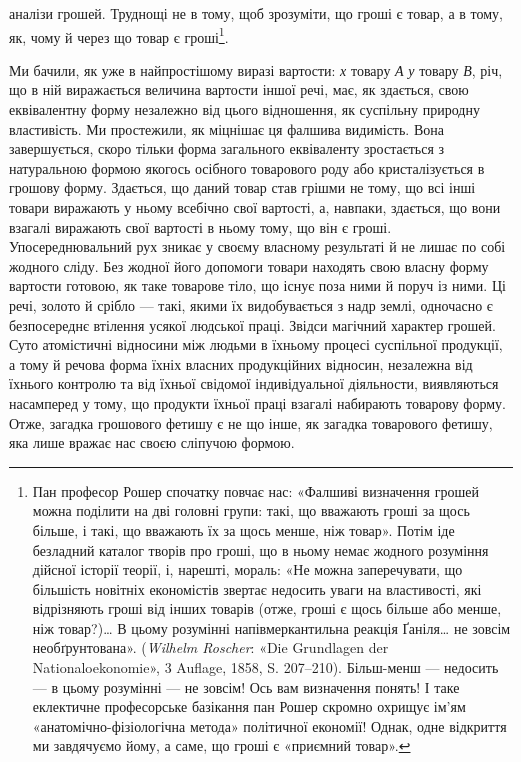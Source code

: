 \parcont{}  %
аналізи грошей. Труднощі не в тому, щоб зрозуміти, що гроші
є товар, а в тому, як, чому й через що товар є гроші\footnote{
Пан професор Рошер спочатку повчає нас: «Фалшиві визначення
грошей можна поділити на дві головні групи: такі, що вважають гроші
за щось більше, і такі, що вважають їх за щось менше, ніж товар». Потім
іде безладний каталог творів про гроші, що в ньому немає жодного
розуміння дійсної історії теорії, і, нарешті, мораль: «Не можна заперечувати,
що більшість новітніх економістів звертає недосить уваги
на властивості, які відрізняють гроші від інших товарів (отже, гроші є
щось більше або менше, ніж товар?)\dots{} В цьому розумінні напівмеркантильна
реакція Ґаніля\dots{} не зовсім необґрунтована». (\emph{Wilhelm Roscher}:
«Die Grundlagen der Nationaloekonomie», 3 Auflage, 1858, S. 207--210).
Більш-менш — недосить — в цьому розумінні — не зовсім! Ось вам визначення
понять! І таке еклектичне професорське базікання пан Рошер
скромно охрищує ім’ям «анатомічно-фізіологічна метода» політичної
економії! Однак, одне відкриття ми завдячуємо йому, а саме, що гроші
є «приємний товар».
}.

Ми бачили, як уже в найпростішому виразі вартости: \emph{х} товару
\emph{А} \deq{} \emph{у} товару \emph{В}, річ, що в ній виражається величина вартости
іншої речі, має, як здається, свою еквівалентну форму незалежно
від цього відношення, як суспільну природну властивість. Ми
простежили, як міцнішає ця фалшива видимість. Вона завершується,
скоро тільки форма загального еквіваленту зростається
з натуральною формою якогось осібного товарового роду або
кристалізується в грошову форму. Здається, що даний товар став
грішми не тому, що всі інші товари виражають у ньому всебічно
свої вартості, а, навпаки, здається, що вони взагалі виражають
свої вартості в ньому тому, що він є гроші. Упосереднювальний
рух зникає у своєму власному результаті й не лишає по собі
жодного сліду. Без жодної його допомоги товари находять свою
власну форму вартости готовою, як таке товарове тіло, що існує
поза ними й поруч із ними. Ці речі, золото й срібло — такі,
якими їх видобувається з надр землі, одночасно є безпосереднє
втілення усякої людської праці. Звідси магічний характер грошей.
Суто атомістичні відносини між людьми в їхньому процесі
суспільної продукції, а тому й речова форма їхніх власних продукційних
відносин, незалежна від їхнього контролю та від
їхньої свідомої індивідуальної діяльности, виявляються насамперед
у тому, що продукти їхньої праці взагалі набирають товарову
форму. Отже, загадка грошового фетишу є не що інше, як
загадка товарового фетишу, яка лише вражає нас своєю сліпучою
формою.

